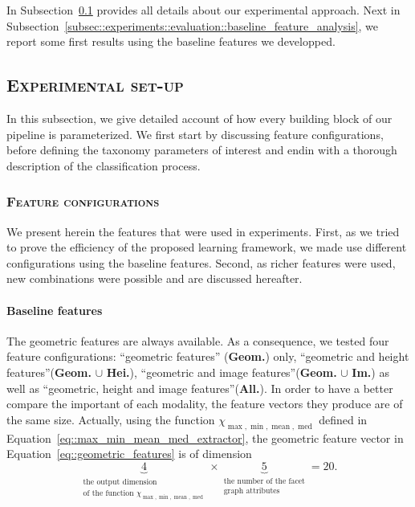     In Subsection~\ref{subsec::experiments::evaluation::setup} provides all details about our experimental approach.
    Next in Subsection~\ref{subsec::experiments::evaluation::baseline_feature_analysis}, we report some first results using the baseline features we developped.

    \subsection{\textsc{Experimental set-up}}
        \label{subsec::experiments::evaluation::setup}
        In this subsection, we give detailed account of how every building block of our pipeline is parameterized.
        We first start by discussing feature configurations, before defining the taxonomy parameters of interest and endin with a thorough description of the classification process.

        \subsubsection{\textsc{Feature configurations}}
            \label{subsubsec::experiments::evaluation::setup::feature_configurations}
            We present herein the features that were used in experiments.
            First, as we tried to prove the efficiency of the proposed learning framework, we made use different configurations using the baseline features.
            Second, as richer features were used, new combinations were possible and are discussed hereafter.

            \paragraph{Baseline features}
                The geometric features are always available.
                As a consequence, we tested four feature configurations: ``geometric features'' (\textbf{Geom.}) only, ``geometric and height features''(\textbf{Geom.} $\cup$ \textbf{Hei.}), ``geometric and image features''(\textbf{Geom.} $\cup$ \textbf{Im.}) as well as ``geometric, height and image features''(\textbf{All.}).
                In order to have a better compare the important of each modality, the feature vectors they produce are of the same size.
                Actually, using the function \(\chi_{\max,\min,\operatorname{mean},\operatorname{med}}\) defined in Equation~\ref{eq::max_min_mean_med_extractor}, the geometric feature vector in Equation~\ref{eq::geometric_features} is of dimension
                \begin{equation*}
                    \underbrace{4}_{\substack{\text{the output dimension}\\\text{of the function } \chi_{\max,\min,\operatorname{mean},\operatorname{med}} }} \times \underbrace{5}_{\substack{\text{the number of the facet}\\\text{graph attributes}}} = 20.
                \end{equation*}

